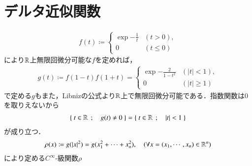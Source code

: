 \section{デルタ近似関数}
	\begin{align}
		f(t) \coloneqq 
		\begin{cases}
			\exp{-\frac{1}{t}} & (t > 0), \\
			0 & (t \leq 0)
		\end{cases}
	\end{align}
	により$\mathbb{R}$上無限回微分可能な$f$を定めれば，
	\begin{align}
		g(t) \coloneqq f(1-t)f(1+t) = 
		\begin{cases}
			\exp{-\frac{2}{1-t^2}} & (|t| < 1), \\
			0 & (|t| \geq 1)
		\end{cases}
	\end{align}
	で定める$g$もまた，Libnizの公式より$\mathbb{R}$上で無限回微分可能である．指数関数は0を取りえないから
	\begin{align}
		\left\{\ t \in \mathbb{R}\ \, ; \quad g(t) \neq 0\ \right\} = \left\{\ t \in \mathbb{R}\ \, ; \quad |t| < 1\ \right\}
	\end{align}
	が成り立つ．
	\begin{align}
		\rho(x) \coloneqq g(|x|^2) = g(x_1^2+ \cdots + x_n^2),
		\quad (\forall x=(x_1,\cdots,x_n) \in \mathbb{R}^n)
	\end{align}
	により定める$C^\infty$-級関数$\rho$